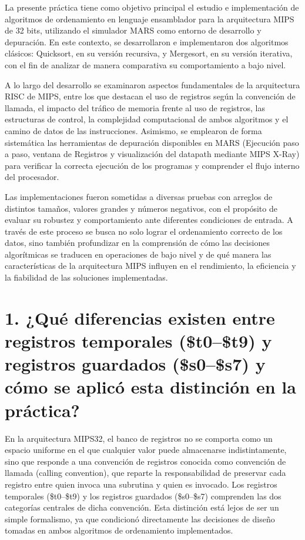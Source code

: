 \documentclass[12pt, letterpaper]{article}
\begin{document}
La presente práctica tiene como objetivo principal el estudio e implementación de algoritmos de ordenamiento en lenguaje ensamblador para la arquitectura MIPS de 32 bits, utilizando el simulador MARS como entorno de desarrollo y depuración. En este contexto, se desarrollaron e implementaron dos algoritmos clásicos: Quicksort, en su versión recursiva, y Mergesort, en su versión iterativa, con el fin de analizar de manera comparativa su comportamiento a bajo nivel.

A lo largo del desarrollo se examinaron aspectos fundamentales de la arquitectura RISC de MIPS, entre los que destacan el uso de registros según la convención de llamada, el impacto del tráfico de memoria frente al uso de registros, las estructuras de control, la complejidad computacional de ambos algoritmos y el camino de datos de las instrucciones. Asimismo, se emplearon de forma sistemática las herramientas de depuración disponibles en MARS (Ejecución paso a paso, ventana de Registros y visualización del datapath mediante MIPS X-Ray) para verificar la correcta ejecución de los programas y comprender el flujo interno del procesador.

Las implementaciones fueron sometidas a diversas pruebas con arreglos de distintos tamaños, valores grandes y números negativos, con el propósito de evaluar su robustez y comportamiento ante diferentes condiciones de entrada. A través de este proceso se busca no solo lograr el ordenamiento correcto de los datos, sino también profundizar en la comprensión de cómo las decisiones algorítmicas se traducen en operaciones de bajo nivel y de qué manera las características de la arquitectura MIPS influyen en el rendimiento, la eficiencia y la fiabilidad de las soluciones implementadas.\\

\section*{1. ¿Qué diferencias existen entre registros temporales (\$t0–\$t9) y registros guardados (\$s0–\$s7) y cómo se aplicó esta distinción en la práctica?}

En la arquitectura MIPS32, el banco de registros no se comporta como un espacio uniforme en el que cualquier valor puede almacenarse indistintamente, sino que responde a una convención de registros conocida como convención de llamada (calling convention), que reparte la responsabilidad de preservar cada registro entre quien invoca una subrutina y quien es invocado. Los registros temporales (\$t0–\$t9) y los registros guardados (\$s0–\$s7) comprenden las dos categorías centrales de dicha convención. Esta distinción está lejos de ser un simple formalismo, ya que condicionó directamente las decisiones de diseño tomadas en ambos algoritmos de ordenamiento implementados.
\end{document}
